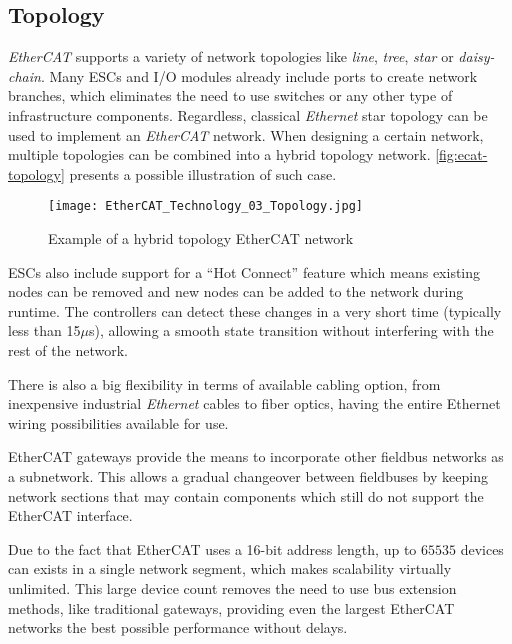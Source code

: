 \subsection{Topology} \label{subsec:ecat-topology}

\emph{EtherCAT} supports a variety of network topologies like \emph{line}, \emph{tree}, \emph{star} or \emph{daisy-chain}.
Many ESCs and I/O modules already include ports to create network branches, which eliminates the need to use switches or any other type of infrastructure components.
Regardless, classical \emph{Ethernet} star topology can be used to implement an \emph{EtherCAT} network.
When designing a certain network, multiple topologies can be combined into a hybrid topology network.
\autoref{fig:ecat-topology} presents a possible illustration of such case.

\begin{figure}[htp]
	\centering
	\texttt{[image: EtherCAT\_Technology\_03\_Topology.jpg]}
	\caption{Example of a hybrid topology EtherCAT network \cite{protocol:ethercat}}
	\label{fig:ecat-topology}
\end{figure}

ESCs also include support for a ``Hot Connect'' feature which means existing nodes can be removed and new nodes can be added to the network during runtime.
The controllers can detect these changes in a very short time (typically less than 15$\mu$s), allowing a smooth state transition without interfering with the rest of the network.

There is also a big flexibility in terms of available cabling option, from inexpensive industrial \emph{Ethernet} cables to fiber optics, having the entire Ethernet wiring possibilities available for use.

EtherCAT gateways provide the means to incorporate other fieldbus networks as a subnetwork.
This allows a gradual changeover between fieldbuses by keeping network sections that may contain components which still do not support the EtherCAT interface.

Due to the fact that EtherCAT uses a 16-bit address length, up to $65535$ devices can exists in a single network segment, which makes scalability virtually unlimited.
This large device count removes the need to use bus extension methods, like traditional gateways, providing even the largest EtherCAT networks the best possible performance without delays.
